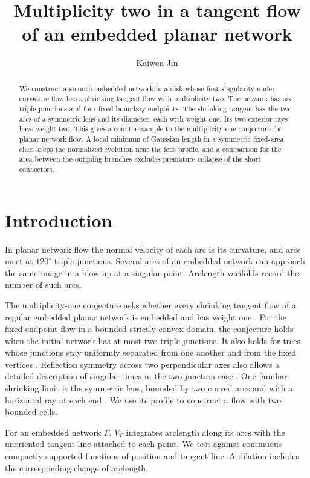 \documentclass[11pt,reqno]{amsart}
\title[Multiplicity two in planar network flow]{Multiplicity two in a tangent flow of an embedded planar network}
\author{Kaiwen Jin}
\begin{document}
\begin{abstract}
We construct a smooth embedded network in a disk whose first singularity
under curvature flow has a shrinking tangent flow with multiplicity two.
The network has six triple junctions and four fixed boundary endpoints.
The shrinking tangent has the two arcs of a symmetric lens and its
diameter, each with weight one. Its two exterior rays have weight two.
This gives a counterexample to the multiplicity-one conjecture for
planar network flow. A local minimum of Gaussian length in a symmetric
fixed-area class keeps the normalized evolution near the lens profile,
and a comparison for the area between the outgoing branches excludes
premature collapse of the short connectors.
\end{abstract}

\maketitle

\section{Introduction}
In planar network flow the normal velocity of each arc is its curvature,
and arcs meet at \(120^\circ\) triple junctions. Several arcs of an embedded
network can approach the same image in a blow-up at a singular point.
Arclength varifolds record the number of such arcs.

The multiplicity-one conjecture asks whether every shrinking tangent
flow of a regular embedded planar network is embedded and has weight
one \cite[Open Problem~10.1]{survey}. For the fixed-endpoint
flow in a bounded strictly convex domain, the conjecture holds when
the initial network has at most two triple junctions. It also holds
for trees whose junctions stay uniformly separated from one another
and from the fixed vertices \cite[Theorem~2.11]{mnp}. Reflection symmetry
across two perpendicular axes also allows a detailed description of
singular times in the two-junction case \cite{sym}. One familiar
shrinking limit is the symmetric lens, bounded by two curved arcs
and with a horizontal ray at each end \cite{lens}. We use its
profile to construct a flow with two bounded cells.

For an embedded network \(\Gamma\), \(V_\Gamma\) integrates
arclength along its arcs with the unoriented tangent line attached to each
point. We test against continuous compactly supported functions of
position and tangent line. A dilation includes the corresponding change
of arclength.
\end{document}
